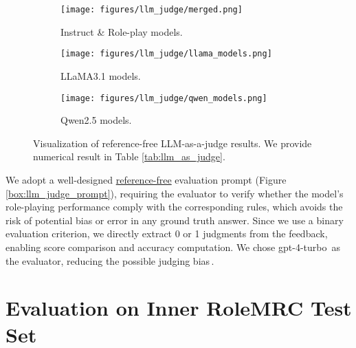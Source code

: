 \begin{figure*}[t]
    \centering
    \begin{subfigure}[b]{0.32\linewidth}
        \centering
        \texttt{[image: figures/llm\_judge/merged.png]}
        \caption{Instruct \& Role-play models.}
        \label{fig:subfig1}
    \end{subfigure}
    \begin{subfigure}[b]{0.32\linewidth}
        \centering
        \texttt{[image: figures/llm\_judge/llama\_models.png]}
        \caption{LLaMA3.1 models.}
        \label{fig:subfig3}
    \end{subfigure}
    \begin{subfigure}[b]{0.32\linewidth}
        \centering
        \texttt{[image: figures/llm\_judge/qwen\_models.png]}
        \caption{Qwen2.5 models.}
        \label{fig:subfig4}
    \end{subfigure}
    \vspace{-2mm}
    \caption{Visualization of reference-free LLM-as-a-judge results. We provide numerical result in Table \ref{tab:llm_as_judge}.}
    \vspace{-2mm}
    \label{fig:mainfig}
\end{figure*}

We adopt a well-designed \underline{reference-free} evaluation prompt (Figure\,\ref{box:llm_judge_prompt}), requiring the evaluator to verify whether the model's role-playing performance comply with the corresponding rules, which avoids the risk of potential bias or error in any ground truth answer. Since we use a binary evaluation criterion, we directly extract 0 or 1 judgments from the feedback, enabling score comparison and accuracy computation. We chose gpt-4-turbo\,\cite{gpt4turbo} as the evaluator, reducing the possible judging bias\,\cite{wataoka2024self}.

\section{Evaluation on Inner RoleMRC Test Set}
\label{sec:results}

